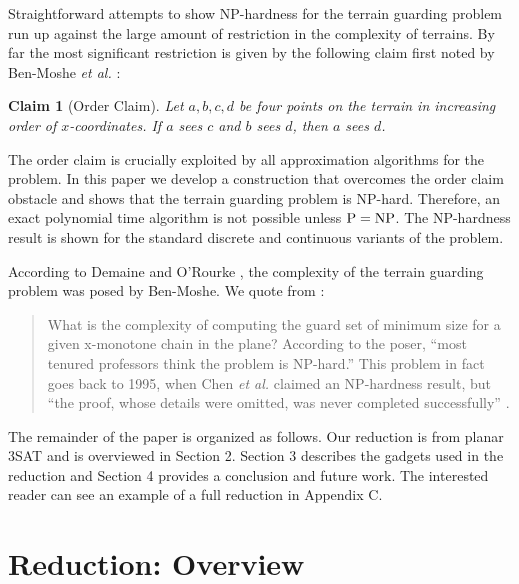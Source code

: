 \documentclass[11pt]{article}
\newtheorem{claim}[theorem]{Claim}
\begin{document}
Straightforward attempts to show NP-hardness for the terrain guarding problem run up against the large amount of restriction in the complexity of terrains.  By far the most significant restriction is given by the following claim first noted by Ben-Moshe \textit{et al.} \cite{MKM05}:

\begin{claim}[Order Claim]
Let $a,b,c,d$ be four points on the terrain in increasing order of $x$-coordinates.  If $a$ sees $c$ and $b$ sees $d$, then $a$ sees $d$.  
\end{claim}

The order claim is crucially exploited by all approximation algorithms for the problem.  In this paper we develop a construction that overcomes the order claim obstacle and shows that the terrain guarding problem is NP-hard.  Therefore, an exact polynomial time algorithm is not possible unless ${\rm P=NP}$.  The NP-hardness result is shown for the standard discrete and continuous variants of the problem.  


According to Demaine and O'Rourke \cite{DO05}, the complexity of the terrain guarding problem was posed by Ben-Moshe. We quote from \cite{DO05}:
\begin{quote}
 What is the complexity of computing the guard set of minimum size for a given x-monotone chain in the plane? According to the poser, ``most tenured professors think the problem is NP-hard.'' This problem in fact goes back to 1995, when Chen \textit{et al.} \cite{CEU96} claimed an NP-hardness result, but ``the proof, whose details were omitted, was never completed successfully'' \cite{K06}.
\end{quote}

The remainder of the paper is organized as follows.  Our reduction is from planar 3SAT and is overviewed in Section 2.  Section 3 describes the gadgets used in the reduction and Section 4 provides a conclusion and future work.  The interested reader can see an example of a full reduction in Appendix C.

\section{Reduction: Overview}
\end{document}
